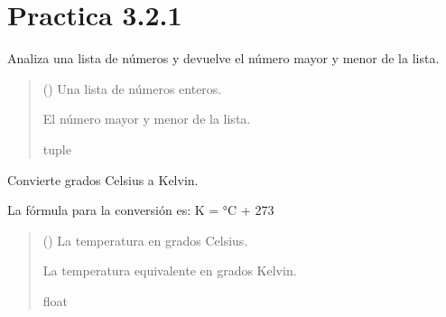 \documentclass[letterpaper,10pt,spanish]{sphinxmanual}
\begin{document}
\section{Practica 3.2.1}
\label{\detokenize{pr3:module-pr3.2_1}}\label{\detokenize{pr3:practica-3-2-1}}

\begin{fulllineitems}
\label{\detokenize{pr3:pr3.2_1.analizar_lista_numeros}}
\pysigstartsignatures
{}
\pysigstopsignatures
\sphinxAtStartPar
Analiza una lista de números y devuelve el número mayor y menor de la lista.
\begin{quote}\begin{description}
\sphinxAtStartPar
{} () \textendash{} Una lista de números enteros.

\sphinxAtStartPar
El número mayor y menor de la lista.

\sphinxAtStartPar
tuple

\end{description}\end{quote}

\end{fulllineitems}


\begin{fulllineitems}
\label{\detokenize{pr3:pr3.2_1.celsius_a_kelvin}}
\pysigstartsignatures
{}
\pysigstopsignatures
\sphinxAtStartPar
Convierte grados Celsius a Kelvin.

\sphinxAtStartPar
La fórmula para la conversión es: K = °C + 273
\begin{quote}\begin{description}
\sphinxAtStartPar
{} () \textendash{} La temperatura en grados Celsius.

\sphinxAtStartPar
La temperatura equivalente en grados Kelvin.

\sphinxAtStartPar
float

\end{description}\end{quote}

\end{fulllineitems}
\end{document}
